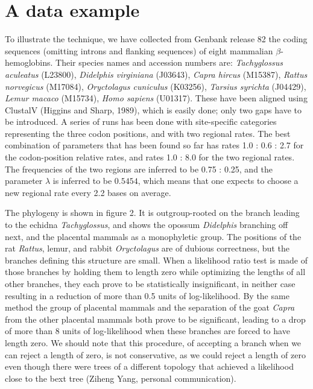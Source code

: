 \documentclass[12pt]{article}
\begin{document}
\section*{A data example}


To illustrate the technique, we have collected from Genbank release 82 the coding
sequences (omitting introns and flanking sequences) of eight mammalian
$\beta$-hemoglobins.  Their species names and accession numbers are:
{\it Tachyglossus aculeatus} (L23800),
{\it Didelphis virginiana} (J03643), 
{\it Capra hircus} (M15387),
{\it Rattus norvegicus} (M17084),
{\it Oryctolagus cuniculus} (K03256),
{\it Tarsius syrichta} (J04429),
{\it Lemur macaco} (M15734),
{\it Homo sapiens} (U01317).
These have been aligned using ClustalV (Higgins and
Sharp, 1989), which is easily done; only two gaps have to be introduced.
A series of runs has been done with site-specific categories representing the
three codon positions, and with two regional rates.  The best combination
of parameters that has been found so far has rates 1.0 : 0.6 : 2.7 for the
codon-position relative rates, and rates 1.0 : 8.0 for the two regional
rates.  The frequencies of the two regions are inferred to be 0.75 : 0.25,
and the parameter $\lambda$ is inferred to be $0.5454$, which means that one
expects to choose a new regional rate every 2.2 bases on average.

The phylogeny is shown in figure 2.  It is outgroup-rooted on the branch
leading to the echidna {\it Tachyglossus}, and shows the opossum {\it Didelphis}
branching off next, and the placental mammals as a monophyletic group.  The
positions of the rat {\it Rattus}, lemur, and rabbit {\it Oryctolagus}
are of dubious correctness, but the branches defining this structure are small.
When a likelihood ratio test is made of those branches by holding them to
length zero while optimizing the lengths of all other branches, they
each prove to be statistically insignificant, in neither case resulting in
a reduction of more than 0.5 units of log-likelihood.  By the same method
the group of placental mammals and the separation of the goat {\it Capra} from
the other placental mammals both prove to be significant, leading to a drop
of more than 8 units of log-likelihood when these branches are forced to
have length zero.  We should note that this procedure, of accepting a branch
when we can reject a length of zero, is not conservative, as we could
reject a length of zero even though there were trees of a different topology that
achieved a likelihood close to the bext tree (Ziheng Yang, personal communication).
\end{document}
